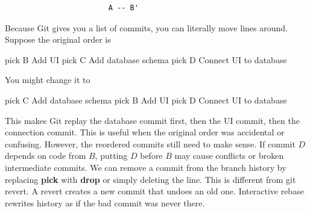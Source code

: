 \documentclass{report}
\begin{document}
\begin{itemize}
\begin{itemize}
                    \begin{verbatim}
                        A -- B' 
                    \end{verbatim}
                    \bigbreak \noindent 
                    Because Git gives you a list of commits, you can literally move lines around. Suppose the original order is 
                    \bigbreak \noindent 
                    \begin{bashcode}
                        pick B Add UI
                        pick C Add database schema
                        pick D Connect UI to database
                    \end{bashcode}
                    \bigbreak \noindent 
                    You might change it to
                    \bigbreak \noindent 
                    \begin{bashcode}
                        pick C Add database schema
                        pick B Add UI
                        pick D Connect UI to database 
                    \end{bashcode}
                    \bigbreak \noindent 
                    This makes Git replay the database commit first, then the UI commit, then the connection commit.
                    \bigbreak \noindent 
                    This is useful when the original order was accidental or confusing. However, the reordered commits still need to make sense. If commit $D$ depends on code from $B$, putting $D$ before $B$ may cause conflicts or broken intermediate commits.
                    \bigbreak \noindent 
                    We can remove a commit from the branch history by replacing \textbf{pick} with \textbf{drop} or simply deleting the line. This is different from git revert. A revert creates a new commit that undoes an old one. Interactive rebase rewrites history as if the bad commit was never there.


\end{itemize}
\end{itemize}
\end{document}
